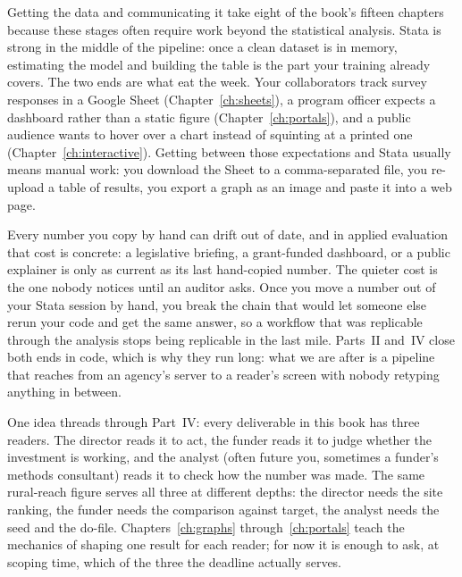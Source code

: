 \documentclass[
    a4paper,
    fontsize=10pt,
    twoside=true,
    numbers=noenddot,
]{kaobook}
\begin{document}
Getting the data and communicating it take eight of the book's fifteen chapters because these stages often require work beyond the statistical analysis. Stata is strong in the middle of the pipeline: once a clean dataset is in memory, estimating the model and building the table is the part your training already covers. The two ends are what eat the week. Your collaborators track survey responses in a Google Sheet (Chapter~\ref{ch:sheets}), a program officer expects a dashboard rather than a static figure (Chapter~\ref{ch:portals}), and a public audience wants to hover over a chart instead of squinting at a printed one (Chapter~\ref{ch:interactive}). Getting between those expectations and Stata usually means manual work: you download the Sheet to a comma-separated file, you re-upload a table of results, you export a graph as an image and paste it into a web page.

Every number you copy by hand can drift out of date, and in applied evaluation that cost is concrete: a legislative briefing, a grant-funded dashboard, or a public explainer is only as current as its last hand-copied number. The quieter cost is the one nobody notices until an auditor asks. Once you move a number out of your Stata session by hand, you break the chain that would let someone else rerun your code and get the same answer, so a workflow that was replicable through the analysis stops being replicable in the last mile. Parts~II and~IV close both ends in code, which is why they run long: what we are after is a pipeline that reaches from an agency's server to a reader's screen with nobody retyping anything in between.

One idea threads through Part~IV: every deliverable in this book has three readers. The director reads it to act, the funder reads it to judge whether the investment is working, and the analyst (often future you, sometimes a funder's methods consultant) reads it to check how the number was made. The same rural-reach figure serves all three at different depths: the director needs the site ranking, the funder needs the comparison against target, the analyst needs the seed and the do-file. Chapters~\ref{ch:graphs} through~\ref{ch:portals} teach the mechanics of shaping one result for each reader; for now it is enough to ask, at scoping time, which of the three the deadline actually serves.
\end{document}

